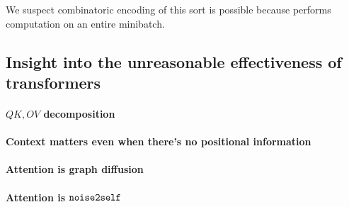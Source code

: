 We suspect combinatoric encoding of this sort is possible because \DeePWAK performs computation on an entire minibatch.

\subsection{Insight into the unreasonable effectiveness of transformers}
\paragraph{$QK,OV$ decomposition}
\paragraph{Context matters even when there's no positional information}
\paragraph{Attention is graph diffusion}
\paragraph{Attention is $\mathop{\mathtt{noise2self}}\limits$}

